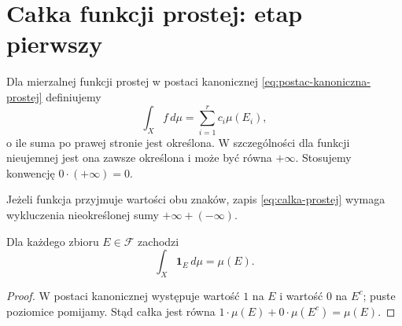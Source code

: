 \section{Całka funkcji prostej: etap pierwszy}
\label{sec:calka-prostej-etap-pierwszy}

\begin{definicja}
\label{def:calka-prostej}
Dla mierzalnej funkcji prostej w postaci kanonicznej
\eqref{eq:postac-kanoniczna-prostej} definiujemy
\begin{equation}
  \int_X f\,d\mu=\sum_{i=1}^{r}c_i\mu(E_i),
  \label{eq:calka-prostej}
\end{equation}
o ile suma po prawej stronie jest określona.
W szczególności dla funkcji nieujemnej jest ona zawsze określona
i może być równa $+\infty$. Stosujemy konwencję $0\cdot(+\infty)=0$.
\end{definicja}

\begin{uwaga}
Jeżeli funkcja przyjmuje wartości obu znaków, zapis
\eqref{eq:calka-prostej} wymaga wykluczenia nieokreślonej sumy
$+\infty+(-\infty)$.
\end{uwaga}

\begin{wniosek}
\label{wn:calka-charakterystycznej}
Dla każdego zbioru $E\in\mathcal{F}$ zachodzi
\[
  \int_X\mathbf{1}_E\,d\mu=\mu(E).
\]
\end{wniosek}

\begin{proof}
W postaci kanonicznej występuje wartość $1$ na $E$ i wartość $0$
na $E^c$; puste poziomice pomijamy. Stąd całka jest równa
$1\cdot\mu(E)+0\cdot\mu(E^c)=\mu(E)$.
\end{proof}
